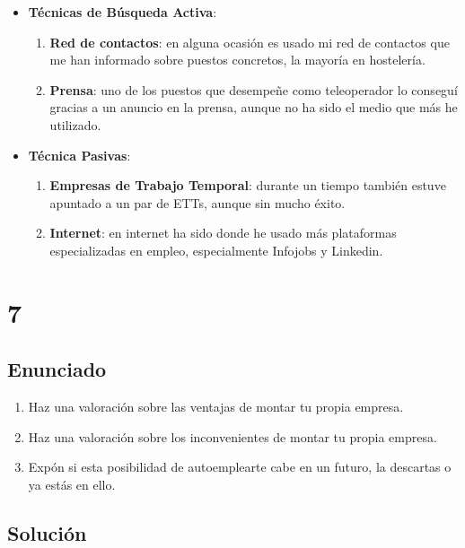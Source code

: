 \begin{itemize}
    \item \textbf{Técnicas de Búsqueda Activa}:
    \begin{enumerate}
        \item \textbf{Red de contactos}: en alguna ocasión es usado mi red de contactos que me han informado sobre puestos concretos, la mayoría en hostelería.
        \item \textbf{Prensa}: uno de los puestos que desempeñe como teleoperador lo conseguí gracias a un anuncio en la prensa, aunque no ha sido el medio que más he utilizado.
    \end{enumerate}
    \item \textbf{Técnica Pasivas}:
    \begin{enumerate}
        \item \textbf{Empresas de Trabajo Temporal}: durante un tiempo también estuve apuntado a un par de ETTs, aunque sin mucho éxito.
        \item \textbf{Internet}: en internet ha sido donde he usado más plataformas especializadas en empleo, especialmente Infojobs y Linkedin.
    \end{enumerate}
\end{itemize}

\section{7}
\subsection{Enunciado}
\begin{enumerate}[label={\alph*}]
    \item Haz una valoración sobre las ventajas de montar tu propia empresa.
    \item Haz una valoración sobre los inconvenientes de montar tu propia empresa.
    \item Expón si esta posibilidad de autoemplearte cabe en un futuro, la descartas o ya estás en ello.
\end{enumerate}

\subsection{Solución}

